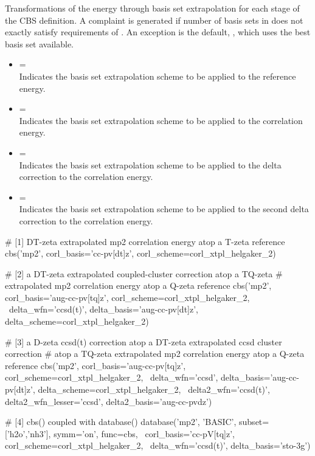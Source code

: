 \begin{itemize}
Transformations of the energy through basis set extrapolation for each stage of the CBS definition.
A complaint is generated if number of basis sets in  does not exactly satisfy
requirements of .
An exception is the default, , which uses the best basis set available.
\begin{itemize}
\item[]  = \textit{} \textbar\;  \\
Indicates the basis set extrapolation scheme to be applied to the reference energy.
\item[]  = \textit{} \textbar\;  \\
Indicates the basis set extrapolation scheme to be applied to the correlation energy.
\item[]  = \textit{} \textbar\;  \\
Indicates the basis set extrapolation scheme to be applied to the delta correction to the correlation energy.
\item[]  = \textit{} \textbar\;  \\
Indicates the basis set extrapolation scheme to be applied to the second delta correction to the correlation energy.
\end{itemize}
\end{itemize}


\begin{Snippet}
# [1] DT-zeta extrapolated mp2 correlation energy atop a T-zeta reference
cbs('mp2', corl_basis='cc-pv[dt]z', corl_scheme=corl_xtpl_helgaker_2)

# [2] a DT-zeta extrapolated coupled-cluster correction atop a TQ-zeta 
#     extrapolated mp2 correlation energy atop a Q-zeta reference
cbs('mp2', corl_basis='aug-cc-pv[tq]z', corl_scheme=corl_xtpl_helgaker_2, \
  delta_wfn='ccsd(t)', delta_basis='aug-cc-pv[dt]z', delta_scheme=corl_xtpl_helgaker_2)

# [3] a D-zeta ccsd(t) correction atop a DT-zeta extrapolated ccsd cluster correction 
#     atop a TQ-zeta extrapolated mp2 correlation energy atop a Q-zeta reference
cbs('mp2', corl_basis='aug-cc-pv[tq]z', corl_scheme=corl_xtpl_helgaker_2, \
  delta_wfn='ccsd', delta_basis='aug-cc-pv[dt]z', delta_scheme=corl_xtpl_helgaker_2, \
  delta2_wfn='ccsd(t)', delta2_wfn_lesser='ccsd', delta2_basis='aug-cc-pvdz')

# [4] cbs() coupled with database()
database('mp2', 'BASIC', subset=['h2o','nh3'], symm='on', func=cbs, \
  corl_basis='cc-pV[tq]z', corl_scheme=corl_xtpl_helgaker_2, \
  delta_wfn='ccsd(t)', delta_basis='sto-3g')
\end{Snippet}

